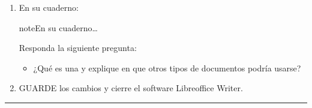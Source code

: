 \documentclass[letterpaper,10pt,spanish]{sphinxmanual}
\begin{document}
\begin{enumerate}
\item {} 
\sphinxAtStartPar
En su cuaderno:

\begin{sphinxadmonition}{note}{En su cuaderno…}

\sphinxAtStartPar
Responda la siguiente pregunta:
\begin{itemize}
\item {} 
\sphinxAtStartPar
¿Qué es una  y explique en que otros tipos de documentos podría usarse?

\end{itemize}
\end{sphinxadmonition}

\item {} 
\sphinxAtStartPar
GUARDE los cambios y cierre el software Libreoffice Writer.

\end{enumerate}


\bigskip\hrule\bigskip
\end{document}
